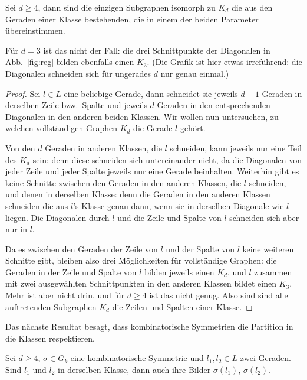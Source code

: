 \begin{lemma}
Sei $d \geq 4$, dann sind die einzigen Subgraphen isomorph zu $K_d$ die aus den Geraden einer Klasse bestehenden, die in einem der beiden Parameter übereinstimmen.
\end{lemma}
\begin{remarks}
Für $d=3$ ist das nicht der Fall: die drei Schnittpunkte der Diagonalen in Abb.~\ref{fig:reg} bilden ebenfalls einen $K_3$. (Die Grafik ist hier etwas irreführend: die Diagonalen schneiden sich für ungerades $d$ nur genau einmal.)
\end{remarks}
\begin{proof}
Sei $l \in L$ eine beliebige Gerade, dann schneidet sie jeweils $d-1$ Geraden in derselben Zeile bzw.~Spalte und jeweils $d$ Geraden in den entsprechenden Diagonalen in den anderen beiden Klassen. Wir wollen nun untersuchen, zu welchen vollständigen Graphen $K_d$ die Gerade $l$ gehört.

Von den $d$ Geraden in anderen Klassen, die $l$ schneiden, kann jeweils nur eine Teil des $K_d$ sein: denn diese schneiden sich untereinander nicht, da die Diagonalen von jeder Zeile und jeder Spalte jeweils nur eine Gerade beinhalten. Weiterhin gibt es keine Schnitte zwischen den Geraden in den anderen Klassen, die $l$ schneiden, und denen in derselben Klasse: denn die Geraden in den anderen Klassen schneiden die aus $l$'s Klasse genau dann, wenn sie in derselben Diagonale wie $l$ liegen. Die Diagonalen durch $l$ und die Zeile und Spalte von $l$ schneiden sich aber nur in $l$.

Da es zwischen den Geraden der Zeile von $l$ und der Spalte von $l$ keine weiteren Schnitte gibt, bleiben also drei Möglichkeiten für vollständige Graphen: die Geraden in der Zeile und Spalte von $l$ bilden jeweils einen $K_d$, und $l$ zusammen mit zwei ausgewählten Schnittpunkten in den anderen Klassen bildet einen $K_3$. Mehr ist aber nicht drin, und für $d \geq 4$ ist das nicht genug. Also sind sind alle auftretenden Subgraphen $K_d$ die Zeilen und Spalten einer Klasse.
\end{proof}
Das nächste Resultat besagt, dass kombinatorische Symmetrien die Partition in die Klassen respektieren.
\begin{lemma}
Sei $d \geq 4$, $\sigma \in G_k$ eine kombinatorische Symmetrie und $l_1, l_2 \in L$ zwei Geraden. Sind $l_1$ und $l_2$ in derselben Klasse, dann auch ihre Bilder $\sigma(l_1)$, $\sigma(l_2)$.
\end{lemma}

